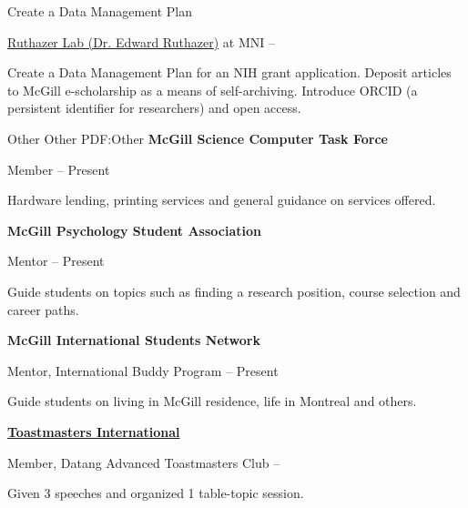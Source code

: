 \documentclass[a4paper,12pt]{article}
\begin{document}
\begin{Body}
\begin{Detail}
\SubBulletItem
Create a Data Management Plan
\end{Detail}

\BulletItem
\href{https://sites.google.com/view/ruthazerlab/home}
{Ruthazer Lab (Dr. Edward Ruthazer)} at MNI
\hfill
{} -- 

\begin{Detail}
\SubBulletItem
Create a Data Management Plan for an NIH grant application.
\SubBulletItem
Deposit articles to McGill e-scholarship as a means of self-archiving.
\SubBulletItem
Introduce ORCID (a persistent identifier for researchers) and open access.
\end{Detail}



\Section
{Other}
{Other}
{PDF:Other}
\Entry
{\textbf{McGill Science Computer Task Force}}

Member
\hfill
{} -- Present

\begin{Detail}
Hardware lending, printing services and general guidance on services offered.
\end{Detail}


\BigGap
\Entry
{\textbf{McGill Psychology Student Association}}

Mentor
\hfill
{} -- Present
\begin{Detail}
Guide students on topics such as finding a research position, course selection and career paths.
\end{Detail}

\BigGap
\Entry
{\textbf{McGill International Students Network}}

Mentor, International Buddy Program
\hfill
{} -- Present
\begin{Detail}
Guide students on living in McGill residence, life in Montreal and others.
\end{Detail}

\BigGap
\Entry
\href{https://www.toastmasters.org/}
{\textbf{Toastmasters International}}

Member, Datang Advanced Toastmasters Club
\hfill
{} -- 

\begin{Detail}
Given 3 speeches and organized 1 table-topic session.
\end{Detail}


\end{Body}
\end{document}

